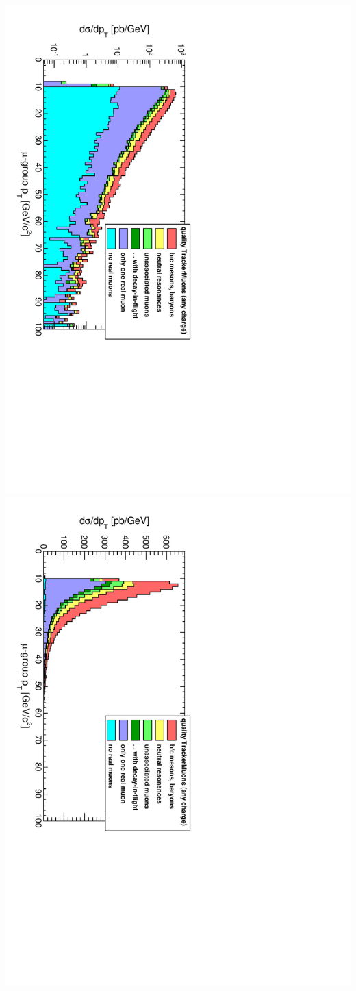 \documentclass[compress]{beamer}
\begin{document}
\begin{frame}
{\includegraphics[height=0.5\linewidth, angle=90]{ptlog_PlainGlobalMuonAny.pdf}
\includegraphics[height=0.5\linewidth, angle=90]{ptlinear_PlainGlobalMuonAny.pdf}}
\end{frame}
\end{document}
